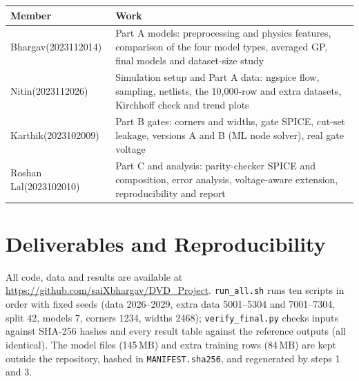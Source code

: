 ﻿\documentclass[conference,10pt]{IEEEtran}
\newcommand{\cc}[1]{\texttt{#1}}
\begin{document}
\begin{center}
\footnotesize
\setlength{\tabcolsep}{3pt}
\begin{tabular}{@{}p{}p{}@{}}
\toprule
Member & Work\\
\midrule
Bhargav\newline(2023112014) & Part A models: preprocessing and physics features, comparison of the four model types, averaged GP, final models and dataset-size study\\
Nitin\newline(2023112026) & Simulation setup and Part A data: ngspice flow, sampling, netlists, the 10,000-row and extra datasets, Kirchhoff check and trend plots\\
Karthik\newline(2023102009) & Part B gates: corners and widths, gate SPICE, cut-set leakage, versions A and B (ML node solver), real gate voltage\\
Roshan Lal\newline(2023102010) & Part C and analysis: parity-checker SPICE and composition, error analysis, voltage-aware extension, reproducibility and report\\
\bottomrule
\end{tabular}
\end{center}

\appendices
\section{Deliverables and Reproducibility}
All code, data and results are available at
\url{https://github.com/saiXbhargav/DVD_Project}.
\cc{run\_all.sh} runs ten scripts in order with fixed seeds (data 2026--2029, extra data
5001--5304 and 7001--7304, split 42, models 7, corners 1234, widths 2468);
\cc{verify\_final.py} checks inputs against SHA-256 hashes and every result table against the
reference outputs (all identical). The model files (145\,MB) and extra training rows (84\,MB) are
kept outside the repository, hashed in \cc{MANIFEST.sha256}, and regenerated by steps 1 and 3.
\end{document}
